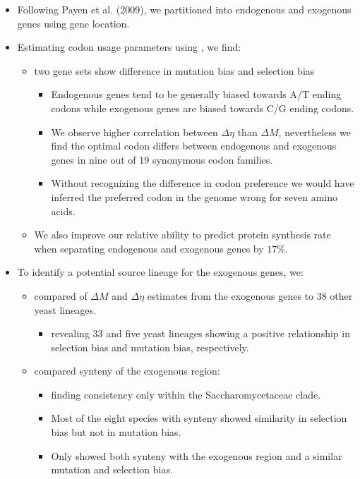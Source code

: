 \documentclass[12pt]{article}
\begin{document}
\begin{itemize}
	\item Following Payen et al. (2009), we partitioned \kluyveri into endogenous and exogenous genes using gene location.
	\item Estimating codon usage parameters using \ROC, we find:
	\begin{itemize}	
 		\item two gene sets show difference in mutation bias and selection bias
		\begin{itemize}
			\item Endogenous genes tend to be generally  biased towards A/T ending codons while exogenous genes are biased towards C/G ending codons.
			\item We observe higher correlation between $\Delta \eta$ than $\Delta M$, nevertheless we find the optimal codon differs between endogenous and exogenous genes in nine out of 19 synonymous codon families. 
			\item Without recognizing the difference in codon preference we would have inferred the preferred codon in the \kluyveri genome wrong for seven amino acids.
			\end{itemize}
		\item We also improve our relative ability to predict protein synthesis rate when separating endogenous and exogenous genes by $17 \%$. 
	\end{itemize}
	\item To identify a potential source lineage for the exogenous genes, we:
	\begin{itemize}
		\item compared of $\Delta M$ and $\Delta \eta$ estimates from the exogenous genes to 38 other yeast lineages.
		\begin{itemize} 
			\item revealing 33 and five yeast lineages showing a positive relationship in selection bias and mutation bias, respectively.
		\end{itemize}
		\item compared synteny of the exogenous region:
		\begin{itemize}
			\item finding consistency only within the Saccharomycetaceae clade.
			\item Most of the eight species with synteny showed similarity in selection bias but not in mutation bias.	
			\item Only \gossypii showed both synteny with the exogenous region and a similar mutation and selection bias.

\end{itemize}
\end{itemize}
\end{itemize}
\end{document}
